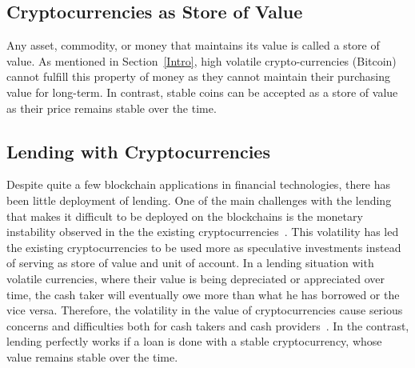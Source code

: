 \subsection{Cryptocurrencies as Store of Value}
Any asset, commodity, or money that maintains its value is called a store of value. As mentioned in Section~\ref{Intro}, high volatile crypto-currencies (\ie Bitcoin) cannot fulfill this property of money as they cannot maintain their purchasing value for long-term. In contrast, stable coins can be accepted as a store of value as their price remains stable over the time.


\subsection{Lending with Cryptocurrencies}
Despite quite a few blockchain applications in financial technologies, there has been little deployment of lending. One of the main challenges with the lending that makes it difficult to be deployed on the blockchains is the monetary instability observed in the the existing cryptocurrencies~\cite{okoyetoward}. This volatility has led the existing cryptocurrencies to be used more as speculative investments instead of serving as store of value and unit of account. In a lending situation with volatile currencies, where their value is being depreciated or appreciated over time, the cash taker will eventually owe more than what he has borrowed or the vice versa. Therefore, the volatility in the value of cryptocurrencies cause serious concerns and difficulties both for cash takers and cash providers~\cite{okoyetoward}. In the contrast, lending perfectly works if a loan is done with a stable cryptocurrency, whose value remains stable over the time.

